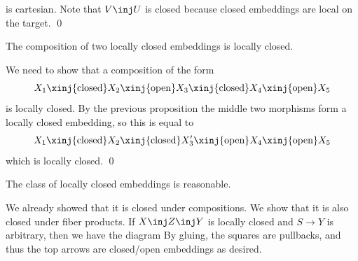 
    is cartesian.
    Note that $V\inj U$ is closed because closed embeddings are local on the target.
    \qed

\eproof

\bprop

    The composition of two locally closed embeddings is locally closed.

\eprop

\bproof

    We need to show that a composition of the form
    $$ X_1 \xinj{\text{closed}} X_2 \xinj{\text{open}} X_3 \xinj{\text{closed}} X_4 \xinj{\text{open}} X_5 $$
    is locally closed.
    By the previous proposition the middle two morphisms form a locally closed embedding, so this is equal to
    $$ X_1 \xinj{\text{closed}} X_2 \xinj{\text{closed}} X'_3 \xinj{\text{open}} X_4 \xinj{\text{open}} X_5 $$
    which is locally closed.
    \qed

\eproof

\bthrm

    The class of locally closed embeddings is reasonable.

\ethrm

\bproof

    We already showed that it is closed under compositions.
    We show that it is also closed under fiber products.
    If $X\inj Z\inj Y$ is locally closed and $S\to Y$ is arbitrary, then we have the diagram
    By gluing, the squares are pullbacks, and thus the top arrows are closed/open embeddings as desired.


